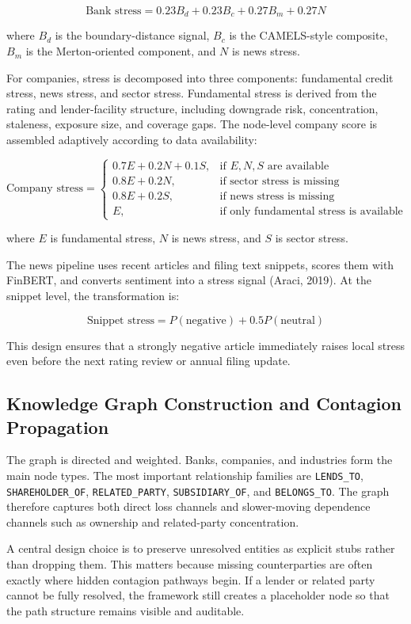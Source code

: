 \documentclass[12pt]{article}
\begin{document}
\[
\text{Bank stress} = 0.23 B_d + 0.23 B_c + 0.27 B_m + 0.27 N
\]

where $B_d$ is the boundary-distance signal, $B_c$ is the CAMELS-style composite, $B_m$ is the Merton-oriented component, and $N$ is news stress.

For companies, stress is decomposed into three components: fundamental credit stress, news stress, and sector stress. Fundamental stress is derived from the rating and lender-facility structure, including downgrade risk, concentration, staleness, exposure size, and coverage gaps. The node-level company score is assembled adaptively according to data availability:

\[
\text{Company stress} =
\begin{cases}
0.7E + 0.2N + 0.1S, & \text{if } E, N, S \text{ are available} \\
0.8E + 0.2N, & \text{if sector stress is missing} \\
0.8E + 0.2S, & \text{if news stress is missing} \\
E, & \text{if only fundamental stress is available}
\end{cases}
\]

where $E$ is fundamental stress, $N$ is news stress, and $S$ is sector stress.

The news pipeline uses recent articles and filing text snippets, scores them with FinBERT, and converts sentiment into a stress signal (Araci, 2019). At the snippet level, the transformation is:

\[
\text{Snippet stress} = P(\text{negative}) + 0.5 P(\text{neutral})
\]

This design ensures that a strongly negative article immediately raises local stress even before the next rating review or annual filing update.

\subsection*{Knowledge Graph Construction and Contagion Propagation}

The graph is directed and weighted. Banks, companies, and industries form the main node types. The most important relationship families are \texttt{LENDS\_TO}, \texttt{SHAREHOLDER\_OF}, \texttt{RELATED\_PARTY}, \texttt{SUBSIDIARY\_OF}, and \texttt{BELONGS\_TO}. The graph therefore captures both direct loss channels and slower-moving dependence channels such as ownership and related-party concentration.

A central design choice is to preserve unresolved entities as explicit stubs rather than dropping them. This matters because missing counterparties are often exactly where hidden contagion pathways begin. If a lender or related party cannot be fully resolved, the framework still creates a placeholder node so that the path structure remains visible and auditable.
\end{document}
